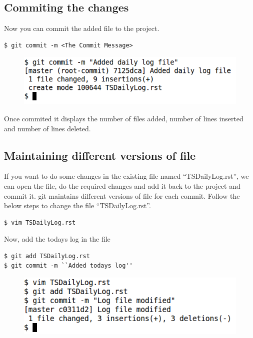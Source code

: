 \documentclass[11pt,a4paper]{article}
\begin{document}
\subsection*{Commiting the changes}
Now you can commit the added file to the project.

\begin{verbatim}
$ git commit -m <The Commit Message>
\end{verbatim}
\begin{figure}[H]
    \begin{center}
        \includegraphics[scale=0.5]{commit1.png}
       \end{center}
    \end{figure}

Once commited it displays the number of files added, number of lines inserted and number of lines deleted.

\subsection*{Maintaining different versions of file}
If you want to do some changes in the existing file named ``TSDailyLog.rst'', we can open the file, do the required changes and add it back to the project and commit it. git maintains different versions of file for each commit. Follow the below steps to change the file ``TSDailyLog.rst''.
\begin{verbatim}
$ vim TSDailyLog.rst
\end{verbatim}
Now, add the todays log in the file
\begin{verbatim}
$ git add TSDailyLog.rst
$ git commit -m ``Added todays log''
\end{verbatim}
\begin{figure}[H]
    \begin{center}
        \includegraphics[scale=0.5]{maintain1.png}
        \end{center}
    \end{figure}
\end{document}
